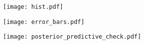\documentclass[a4paper, 10pt]{article}
\begin{document}
\begin{figure}
\begin{center}
\texttt{[image: hist.pdf]}
\end{center}
\end{figure}


\begin{figure}
\begin{center}
\texttt{[image: error\_bars.pdf]}
\end{center}
\end{figure}


\begin{figure}
\begin{center}
\texttt{[image: posterior\_predictive\_check.pdf]}
\end{center}
\end{figure}
\end{document}
